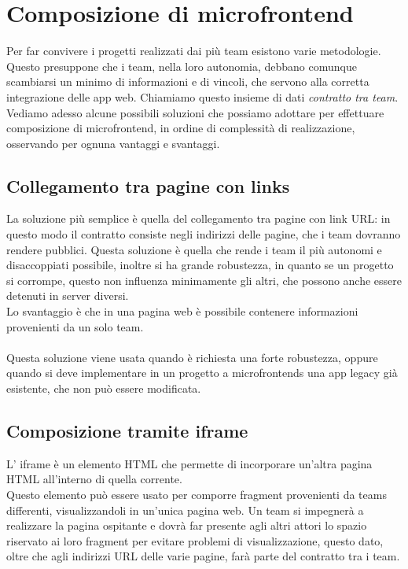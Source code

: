 \chapter{Composizione di microfrontend}\label{ch:composizione}
Per far convivere i progetti realizzati dai più team esistono varie metodologie. Questo
 presuppone che i team, nella loro autonomia, debbano comunque scambiarsi un minimo di informazioni e di vincoli,
che servono alla corretta integrazione delle app web. Chiamiamo questo insieme di dati \emph{contratto tra team}.
\\Vediamo adesso alcune possibili soluzioni che possiamo adottare per effettuare composizione di microfrontend, in ordine di complessità 
di realizzazione, osservando per ognuna vantaggi e svantaggi.
\section{Collegamento tra pagine con links}
La soluzione più semplice è quella del collegamento tra pagine con link URL: in questo modo il contratto consiste negli indirizzi delle pagine,
che i team dovranno rendere pubblici.
Questa soluzione è quella che rende i team il più autonomi e disaccoppiati possibile, inoltre
si ha grande robustezza, in quanto se un progetto si corrompe, questo non influenza minimamente gli altri,
che possono anche essere detenuti in server diversi.
\\Lo svantaggio è che in una pagina web è possibile contenere informazioni provenienti da un solo team.
\\\\Questa soluzione viene usata quando è richiesta una forte robustezza, oppure quando si deve implementare 
in un progetto a microfrontends una app legacy già esistente, che non può essere modificata.
\section{Composizione tramite iframe}
L' iframe è un elemento HTML che permette di incorporare un'altra pagina HTML all'interno di quella corrente. \cite{mozillaiframe}
\\Questo elemento può essere usato per comporre fragment provenienti da teams differenti, visualizzandoli in un'unica
pagina web.
Un team si impegnerà a realizzare la pagina ospitante e dovrà far presente agli altri attori lo spazio riservato
ai loro fragment per evitare problemi di visualizzazione, questo dato, oltre che agli indirizzi
URL delle varie pagine, farà parte del contratto tra i team.

